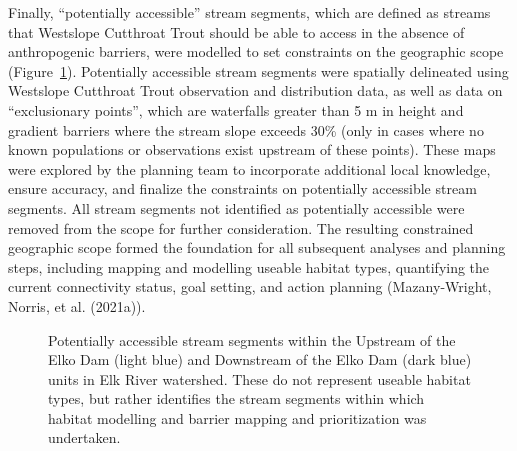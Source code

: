 \documentclass[
  letterpaper,
  DIV=11,
  numbers=noendperiod]{scrreprt}
\begin{document}
Finally, ``potentially accessible'' stream segments, which are defined
as streams that Westslope Cutthroat Trout should be able to access in
the absence of anthropogenic barriers, were modelled to set constraints
on the geographic scope (Figure~\ref{fig-strseg}). Potentially
accessible stream segments were spatially delineated using Westslope
Cutthroat Trout observation and distribution data, as well as data on
``exclusionary points'', which are waterfalls greater than 5 m in height
and gradient barriers where the stream slope exceeds 30\% (only in cases
where no known populations or observations exist upstream of these
points). These maps were explored by the planning team to incorporate
additional local knowledge, ensure accuracy, and finalize the
constraints on potentially accessible stream segments. All stream
segments not identified as potentially accessible were removed from the
scope for further consideration. The resulting constrained geographic
scope formed the foundation for all subsequent analyses and planning
steps, including mapping and modelling useable habitat types,
quantifying the current connectivity status, goal setting, and action
planning (Mazany-Wright, Norris, et al. (2021a)).

\begin{figure}


\caption{\label{fig-strseg}Potentially accessible stream segments within
the Upstream of the Elko Dam (light blue) and Downstream of the Elko Dam
(dark blue) units in Elk River watershed. These do not represent useable
habitat types, but rather identifies the stream segments within which
habitat modelling and barrier mapping and prioritization was
undertaken.}

\end{figure}%
\end{document}
